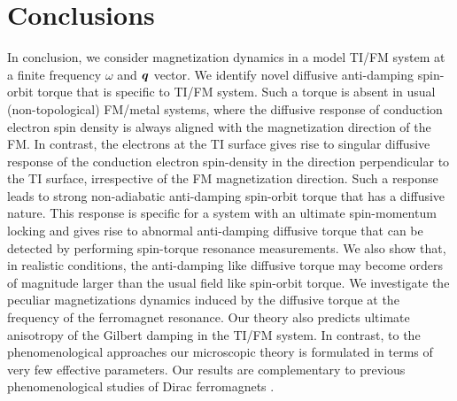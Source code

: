 \section{Conclusions}
In conclusion, we consider magnetization dynamics in a model TI/FM system at a finite frequency $\omega$ and $\boldsymbol{q}$ vector. We identify novel diffusive anti-damping spin-orbit torque that is specific to TI/FM system.  Such a torque is absent in usual (non-topological) FM/metal systems, where the diffusive response of conduction electron spin density is always aligned with the magnetization direction of the FM. In contrast, the electrons at the TI surface gives rise to singular diffusive response of the conduction electron spin-density in the direction perpendicular to the TI surface, irrespective of the FM magnetization direction. Such a response leads to strong non-adiabatic anti-damping spin-orbit torque that has a diffusive nature. This response is specific for a system with an ultimate spin-momentum locking and gives rise to abnormal anti-damping diffusive torque that can be detected by performing spin-torque resonance measurements. We also show that, in realistic conditions, the anti-damping like diffusive torque may become orders of magnitude larger than the usual field like spin-orbit torque. We investigate the peculiar magnetizations dynamics induced by the diffusive torque at the frequency of the ferromagnet resonance. Our theory also predicts ultimate anisotropy of the Gilbert damping in the TI/FM system. In contrast, to the phenomenological approaches \cite{vanderBijl2012,Hals2013} our microscopic theory is formulated in terms of very few effective parameters. Our results are complementary to previous phenomenological studies of Dirac ferromagnets \cite{tserkovnyak_theory_2009,mahfouzi_spin-orbit_2012,katsnelson15,fischer_spin-torque_2016,yokoyama_theoretical_2010,yokoyama_current-induced_2011,siu_spin_2016,mahfouzi_antidamping_2016,soleimani_spin-orbit_2017,kurebayashi_microscopic_2017,chen_current-induced_2017,rodriguez-vega_giant_2016,qi_topological_2008,garate_inverse_2010,yokoyama_theoretical_2010,yokoyama_current-induced_2011,nomura_electric_2010,tserkovnyak_thin-film_2012-1,linder_improved_2014,tserkovnyak_spin_2015,ueda_topological_2012,liu_reading_2013,chang_nonequilibrium_2015,fischer_spin-torque_2016,mahfouzi_antidamping_2016,fujimoto_transport_2014,okuma_unconventional_2016}.


